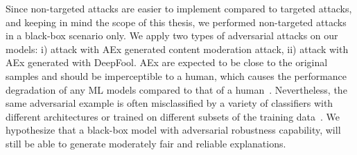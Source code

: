 \hspace*{3.5mm} Since non-targeted attacks are easier to implement compared to targeted attacks, and keeping in mind the scope of this thesis, we performed non-targeted attacks in a black-box scenario only. We apply two types of adversarial attacks on our models: i) attack with AEx generated content moderation attack, ii) attack with AEx generated with DeepFool. %
AEx are expected to be close to the original samples and should be imperceptible to a human, which causes the performance degradation of any ML models compared to that of a human~\cite{goodfellow2014explaining}. Nevertheless, the same adversarial example is often misclassified by a variety of classifiers with different architectures or trained on different subsets of the training data~\cite{yuan2019adversarial,goodfellow2014explaining}. We hypothesize that a black-box model with adversarial robustness capability, will still be able to generate moderately fair and reliable explanations. 

